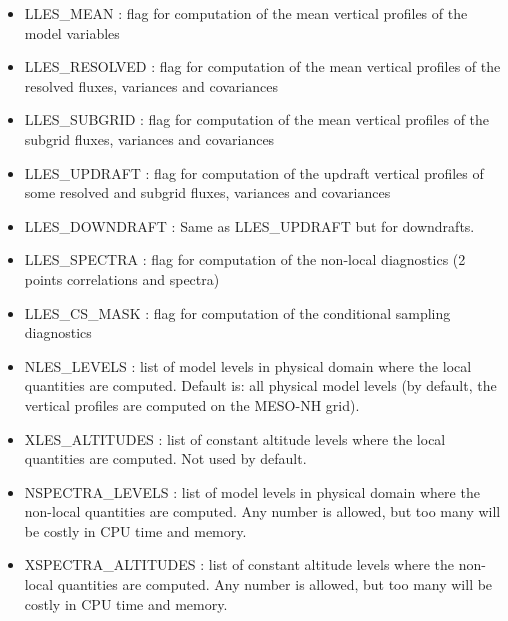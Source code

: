 \begin{itemize}
\item
LLES\_MEAN  : flag for computation of the
mean vertical profiles of the model variables

\item
LLES\_RESOLVED : flag for computation of the
mean vertical profiles of the resolved fluxes, variances and covariances

\item
LLES\_SUBGRID : flag for computation of the
mean vertical profiles of the subgrid fluxes, variances and covariances

\item
LLES\_UPDRAFT : flag for computation of the
updraft vertical profiles of some resolved and subgrid fluxes,
variances and covariances

\item
LLES\_DOWNDRAFT  : Same as LLES\_UPDRAFT but for downdrafts.
\item
LLES\_SPECTRA  : flag for computation of the
non-local diagnostics (2 points correlations and spectra)

\item
LLES\_CS\_MASK  : flag for computation of the
conditional sampling diagnostics                           
\item
NLES\_LEVELS : list of model levels in physical domain where the local quantities
are computed. Default is: all physical model levels (by default, the vertical profiles
are computed on the MESO-NH grid).

\item
XLES\_ALTITUDES : list of constant altitude levels where
the local quantities are computed. Not used by default.

\item
NSPECTRA\_LEVELS  : list of model levels in physical domain where the non-local quantities
are computed. Any number is allowed, but too many will be costly
in CPU time and memory.

\item
XSPECTRA\_ALTITUDES  : list of constant altitude levels where
the non-local quantities are computed. Any number is allowed,
but too many will be costly in CPU time and memory.


\end{itemize}
